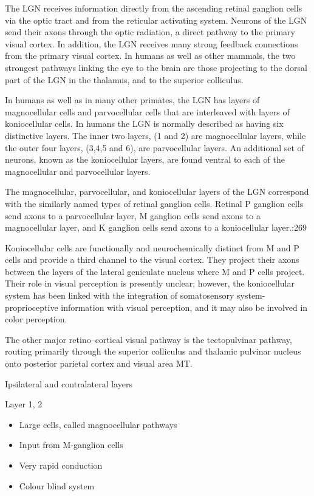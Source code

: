 The LGN receives information directly from the ascending retinal ganglion cells via the optic tract and from the reticular activating system. Neurons of the LGN send their axons through the optic radiation, a direct pathway to the primary visual cortex. In addition, the LGN receives many strong feedback connections from the primary visual cortex. In humans as well as other mammals, the two strongest pathways linking the eye to the brain are those projecting to the dorsal part of the LGN in the thalamus, and to the superior colliculus.

In humans as well as in many other primates, the LGN has layers of magnocellular cells and parvocellular cells that are interleaved with layers of koniocellular cells. In humans the LGN is normally described as having six distinctive layers. The inner two layers, (1 and 2) are magnocellular layers, while the outer four layers, (3,4,5 and 6), are parvocellular layers. An additional set of neurons, known as the koniocellular layers, are found ventral to each of the magnocellular and parvocellular layers.

The magnocellular, parvocellular, and koniocellular layers of the LGN correspond with the similarly named types of retinal ganglion cells. Retinal P ganglion cells send axons to a parvocellular layer, M ganglion cells send axons to a magnocellular layer, and K ganglion cells send axons to a koniocellular layer.:269

Koniocellular cells are functionally and neurochemically distinct from M and P cells and provide a third channel to the visual cortex. They project their axons between the layers of the lateral geniculate nucleus where M and P cells project. Their role in visual perception is presently unclear; however, the koniocellular system has been linked with the integration of somatosensory system-proprioceptive information with visual perception, and it may also be involved in color perception.

The other major retino--cortical visual pathway is the tectopulvinar pathway, routing primarily through the superior colliculus and thalamic pulvinar nucleus onto posterior parietal cortex and visual area MT.

Ipsilateral and contralateral layers

Layer 1, 2

\begin{itemize}
\tightlist
\item
  Large cells, called magnocellular pathways
\item
  Input from M-ganglion cells
\item
  Very rapid conduction
\item
  Colour blind system
\end{itemize}

